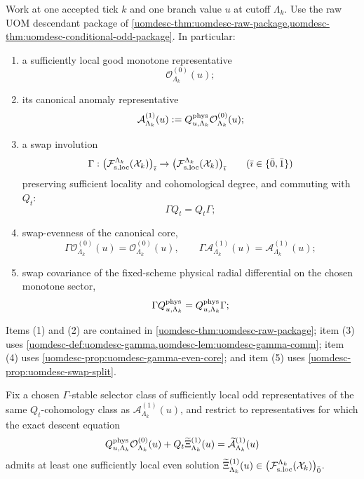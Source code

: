 \documentclass[11pt]{article}
\begin{document}
Work at one accepted tick \(k\) and one branch value \(u\) at cutoff \(\Lambda_k\).
Use the raw UOM descendant package of
\cref{uomdesc-thm:uomdesc-raw-package,uomdesc-thm:uomdesc-conditional-odd-package}.
In particular:
\begin{enumerate}[leftmargin=2em]
\item a sufficiently local good monotone representative
  \[
  \mathcal O^{(0)}_{\Lambda_k}(u);
  \]
\item its canonical anomaly representative
  \[
  \mathcal A^{(1)}_{\Lambda_k}(u)
  :=
  Q^{\rm phys}_{u,\Lambda_k}\mathcal O^{(0)}_{\Lambda_k}(u);
  \]
\item a swap involution
  \[
  \Gamma:
  \big(\mathcal F_{\rm s.loc}^{\Lambda_k}(\mathcal X_k)\big)_{\bar\imath}
  \to
  \big(\mathcal F_{\rm s.loc}^{\Lambda_k}(\mathcal X_k)\big)_{\bar\imath}
  \qquad
  (\bar\imath\in\{\bar 0,\bar 1\})
  \]
  preserving sufficient locality and cohomological degree, and commuting with \(Q_t\):
  \[
  \Gamma Q_t=Q_t\Gamma;
  \]
\item swap-evenness of the canonical core,
  \[
  \Gamma\mathcal O^{(0)}_{\Lambda_k}(u)=\mathcal O^{(0)}_{\Lambda_k}(u),
  \qquad
  \Gamma\mathcal A^{(1)}_{\Lambda_k}(u)=\mathcal A^{(1)}_{\Lambda_k}(u);
  \]
\item swap covariance of the fixed-scheme physical radial differential on the chosen monotone
  sector,
  \[
  \Gamma Q^{\rm phys}_{u,\Lambda_k}
  =
  Q^{\rm phys}_{u,\Lambda_k}\Gamma;
  \]
\end{enumerate}
Items (1) and (2) are contained in \cref{uomdesc-thm:uomdesc-raw-package};
item (3) uses \cref{uomdesc-def:uomdesc-gamma,uomdesc-lem:uomdesc-gamma-comm};
item (4) uses \cref{uomdesc-prop:uomdesc-gamma-even-core}; and item (5) uses
\cref{uomdesc-prop:uomdesc-swap-split}.

Fix a chosen \(\Gamma\)-stable selector class of sufficiently local odd representatives of the same
\(Q_t\)-cohomology class as \(\mathcal A^{(1)}_{\Lambda_k}(u)\), and restrict to representatives
for which the exact descent equation
\begin{equation}
Q^{\rm phys}_{u,\Lambda_k}\mathcal O^{(0)}_{\Lambda_k}(u)
+
Q_t\widetilde{\Xi}^{(1)}_{\Lambda_k}(u)
=
\widetilde{\mathcal A}^{(1)}_{\Lambda_k}(u)
\label{eq:selector-full-descent}
\end{equation}
admits at least one sufficiently local even solution
\(
\widetilde{\Xi}^{(1)}_{\Lambda_k}(u)
\in
\big(\mathcal F_{\rm s.loc}^{\Lambda_k}(\mathcal X_k)\big)_{\bar 0}
\).
\end{document}

